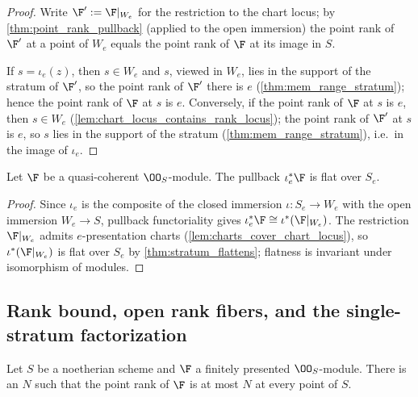 \begin{proof}
  \leanok
  Write \(\F' := \F|_{W_e}\) for the restriction to the chart locus; by
  \cref{thm:point_rank_pullback} (applied to the open immersion) the point
  rank of \(\F'\) at a point of \(W_e\) equals the point rank of \(\F\) at
  its image in \(S\).

  If \(s = \iota_e(z)\), then \(s \in W_e\) and \(s\), viewed in \(W_e\),
  lies in the support of the stratum of \(\F'\), so the point rank of
  \(\F'\) there is \(e\) (\cref{thm:mem_range_stratum}); hence the point
  rank of \(\F\) at \(s\) is \(e\).  Conversely, if the point rank of
  \(\F\) at \(s\) is \(e\), then \(s \in W_e\)
  (\cref{lem:chart_locus_contains_rank_locus}); the point rank of \(\F'\)
  at \(s\) is \(e\), so \(s\) lies in the support of the stratum
  (\cref{thm:mem_range_stratum}), i.e.\ in the image of \(\iota_e\).
\end{proof}

\begin{theorem}
  \label{thm:rank_stratum_flattens}
  \leanok
  Let \(\F\) be a quasi-coherent \(\OO_S\)-module.  The pullback
  \(\iota_e^*\F\) is flat over \(S_e\).
\end{theorem}

\begin{proof}
  \leanok
  Since \(\iota_e\) is the composite of the closed immersion
  \(\iota : S_e \to W_e\) with the open immersion \(W_e \to S\), pullback
  functoriality gives \(\iota_e^*\F \cong \iota^*(\F|_{W_e})\).  The
  restriction \(\F|_{W_e}\) admits \(e\)-presentation charts
  (\cref{lem:charts_cover_chart_locus}), so \(\iota^*(\F|_{W_e})\) is flat
  over \(S_e\) by \cref{thm:stratum_flattens}; flatness is invariant under
  isomorphism of modules.
\end{proof}

\subsection{Rank bound, open rank fibers, and the single-stratum
  factorization}

\begin{lemma}
  \label{lem:point_rank_bounded}
  \leanok
  Let \(S\) be a noetherian scheme and \(\F\) a finitely presented
  \(\OO_S\)-module.  There is an \(N\) such that the point rank of \(\F\)
  is at most \(N\) at every point of \(S\).
\end{lemma}

